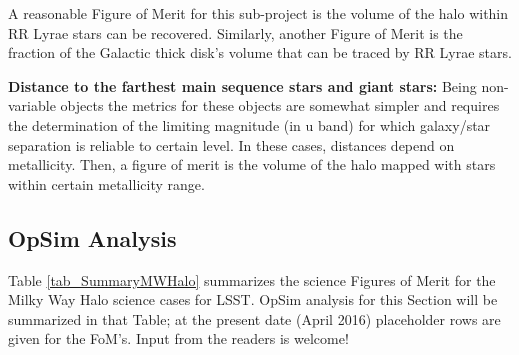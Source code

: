 A reasonable Figure of Merit for this sub-project is the volume of the halo within RR Lyrae stars 
can be recovered. Similarly, another Figure of Merit is the fraction of the Galactic thick disk's volume that can be 
traced by RR Lyrae stars.

\textbf{Distance to the farthest main sequence stars and giant stars:} Being non-variable objects
the metrics for these objects are somewhat simpler and requires the determination of the limiting
magnitude (in u band) for which galaxy/star separation is reliable to certain level. In these cases, distances
depend on metallicity. Then, a figure of
merit is the volume of the halo mapped with stars within certain metallicity range. 



\subsection{OpSim Analysis}
\label{sec:\secname:MW_Halo_analysis}

Table \ref{tab_SummaryMWHalo} summarizes the science Figures of Merit
for the Milky Way Halo science cases for LSST. OpSim analysis for this
Section will be summarized in that Table; at the present date (April
2016) placeholder rows are given for the FoM's. Input from the readers
is welcome!


